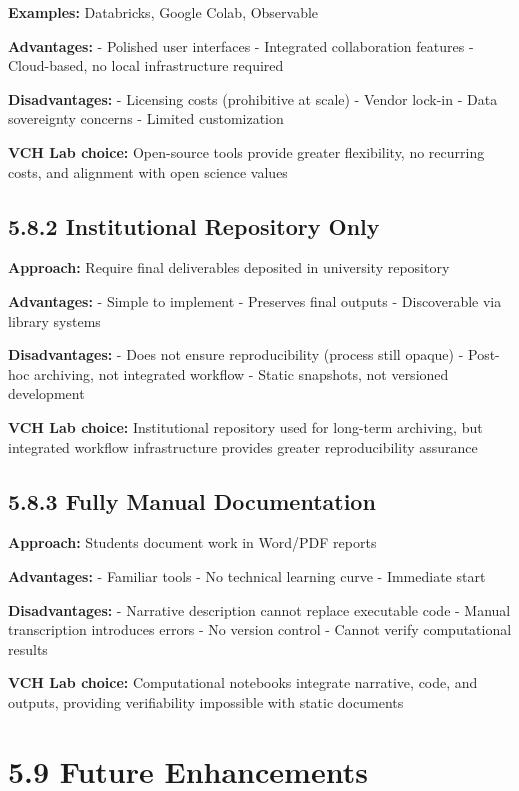 \documentclass[
  oneside,
  open=any]{scrbook}
\begin{document}
\textbf{Examples:} Databricks, Google Colab, Observable

\textbf{Advantages:} - Polished user interfaces - Integrated
collaboration features - Cloud-based, no local infrastructure required

\textbf{Disadvantages:} - Licensing costs (prohibitive at scale) -
Vendor lock-in - Data sovereignty concerns - Limited customization

\textbf{VCH Lab choice:} Open-source tools provide greater flexibility,
no recurring costs, and alignment with open science values

\subsection{5.8.2 Institutional Repository
Only}\label{institutional-repository-only}

\textbf{Approach:} Require final deliverables deposited in university
repository

\textbf{Advantages:} - Simple to implement - Preserves final outputs -
Discoverable via library systems

\textbf{Disadvantages:} - Does not ensure reproducibility (process still
opaque) - Post-hoc archiving, not integrated workflow - Static
snapshots, not versioned development

\textbf{VCH Lab choice:} Institutional repository used for long-term
archiving, but integrated workflow infrastructure provides greater
reproducibility assurance

\subsection{5.8.3 Fully Manual
Documentation}\label{fully-manual-documentation}

\textbf{Approach:} Students document work in Word/PDF reports

\textbf{Advantages:} - Familiar tools - No technical learning curve -
Immediate start

\textbf{Disadvantages:} - Narrative description cannot replace
executable code - Manual transcription introduces errors - No version
control - Cannot verify computational results

\textbf{VCH Lab choice:} Computational notebooks integrate narrative,
code, and outputs, providing verifiability impossible with static
documents

\section{5.9 Future Enhancements}\label{future-enhancements}
\end{document}
